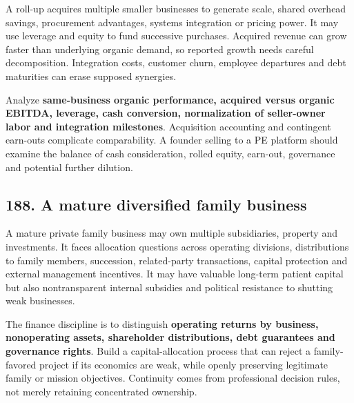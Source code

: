 A roll-up acquires multiple smaller businesses to generate scale, shared overhead savings, procurement advantages, systems integration or pricing power. It may use leverage and equity to fund successive purchases. Acquired revenue can grow faster than underlying organic demand, so reported growth needs careful decomposition. Integration costs, customer churn, employee departures and debt maturities can erase supposed synergies.

Analyze \textbf{same-business organic performance, acquired versus organic EBITDA, leverage, cash conversion, normalization of seller-owner labor and integration milestones}. Acquisition accounting and contingent earn-outs complicate comparability. A founder selling to a PE platform should examine the balance of cash consideration, rolled equity, earn-out, governance and potential further dilution.

\subsection{188. A mature diversified family business}


A mature private family business may own multiple subsidiaries, property and investments. It faces allocation questions across operating divisions, distributions to family members, succession, related-party transactions, capital protection and external management incentives. It may have valuable long-term patient capital but also nontransparent internal subsidies and political resistance to shutting weak businesses.

The finance discipline is to distinguish \textbf{operating returns by business, nonoperating assets, shareholder distributions, debt guarantees and governance rights}. Build a capital-allocation process that can reject a family-favored project if its economics are weak, while openly preserving legitimate family or mission objectives. Continuity comes from professional decision rules, not merely retaining concentrated ownership.

